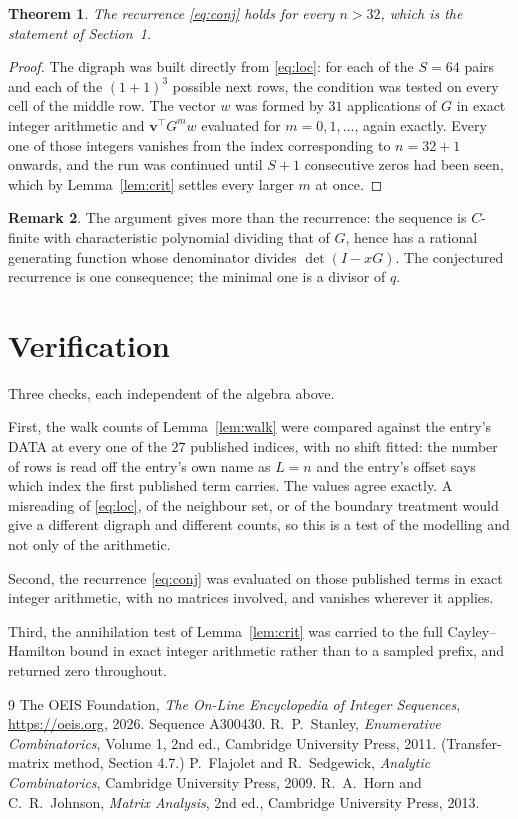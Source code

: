 \documentclass[11pt,a4paper]{article}
\theoremstyle{plain}
\newtheorem{theorem}{Theorem}
\theoremstyle{definition}
\newtheorem{remark}[theorem]{Remark}
\begin{document}
\begin{theorem}
The recurrence \eqref{eq:conj} holds for every $n>32$, which is the statement of
Section~1.
\end{theorem}

\begin{proof}
The digraph was built directly from \eqref{eq:loc}: for each of the $S=64$ pairs and each
of the $(1+1)^{3}$ possible next rows, the condition was tested on every cell of
the middle row. The vector $w$ was formed by $31$ applications of $G$ in exact integer
arithmetic and $\mathbf{v}^{\!\top}G^{m}w$ evaluated for $m=0,1,\dots$, again exactly.
Every one of those integers vanishes from the index corresponding to $n=32+1$ onwards,
and the run was continued until $S+1$ consecutive zeros had been seen, which by
Lemma~\ref{lem:crit} settles every larger $m$ at once.
\end{proof}

\begin{remark}
The argument gives more than the recurrence: the sequence is $C$-finite with characteristic
polynomial dividing that of $G$, hence has a rational generating function whose denominator
divides $\det(I-xG)$. The conjectured recurrence is one consequence; the minimal one is a
divisor of $q$.
\end{remark}

\section{Verification}

Three checks, each independent of the algebra above.

First, the walk counts of Lemma~\ref{lem:walk} were compared against the entry's DATA at
every one of the $27$ published indices, with no shift fitted: the number of rows is
read off the entry's own name as $L=n$ and the entry's offset says which index the first
published term carries. The values agree exactly. A misreading of \eqref{eq:loc}, of the
neighbour set, or of the boundary treatment would give a different digraph and different
counts, so this is a test of the modelling and not only of the arithmetic.

Second, the recurrence \eqref{eq:conj} was evaluated on those published terms in exact
integer arithmetic, with no matrices involved, and vanishes wherever it applies.

Third, the annihilation test of Lemma~\ref{lem:crit} was carried to the full
Cayley--Hamilton bound in exact integer arithmetic rather than to a sampled prefix, and
returned zero throughout.

\begin{thebibliography}{9}
 The OEIS Foundation, \emph{The On-Line Encyclopedia of Integer
Sequences}, \url{https://oeis.org}, 2026. Sequence A300430.
 R.~P.~Stanley, \emph{Enumerative Combinatorics}, Volume 1, 2nd ed.,
Cambridge University Press, 2011. (Transfer-matrix method, Section 4.7.)
 P.~Flajolet and R.~Sedgewick, \emph{Analytic Combinatorics}, Cambridge
University Press, 2009.
 R.~A.~Horn and C.~R.~Johnson, \emph{Matrix Analysis}, 2nd ed., Cambridge
University Press, 2013.
\end{thebibliography}
\end{document}
